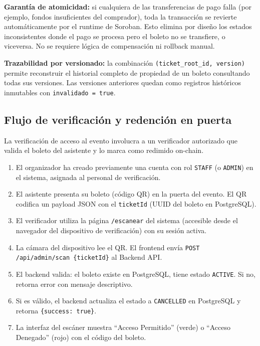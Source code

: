 \documentclass[12pt,oneside]{article}
\begin{document}
\textbf{Garantía de atomicidad:} si cualquiera de las transferencias de pago falla (por ejemplo, fondos insuficientes del comprador), toda la transacción se revierte automáticamente por el runtime de Soroban. Esto elimina por diseño los estados inconsistentes donde el pago se procesa pero el boleto no se transfiere, o viceversa. No se requiere lógica de compensación ni rollback manual.

\textbf{Trazabilidad por versionado:} la combinación \texttt{(ticket\_root\_id, version)} permite reconstruir el historial completo de propiedad de un boleto consultando todas sus versiones. Las versiones anteriores quedan como registros históricos inmutables con \texttt{invalidado = true}.

\subsection{Flujo de verificación y redención en puerta}

La verificación de acceso al evento involucra a un verificador autorizado que valida el boleto del asistente y lo marca como redimido on-chain.

\begin{enumerate}
  \item El organizador ha creado previamente una cuenta con rol \texttt{STAFF} (o \texttt{ADMIN}) en el sistema, asignada al personal de verificación.
  \item El asistente presenta su boleto (código QR) en la puerta del evento. El QR codifica un payload JSON con el \texttt{ticketId} (UUID del boleto en PostgreSQL).
  \item El verificador utiliza la página \texttt{/escanear} del sistema (accesible desde el navegador del dispositivo de verificación) con su sesión activa.
  \item La cámara del dispositivo lee el QR. El frontend envía \texttt{POST /api/admin/scan \{ticketId\}} al Backend API.
  \item El backend valida: el boleto existe en PostgreSQL, tiene estado \texttt{ACTIVE}. Si no, retorna error con mensaje descriptivo.
  \item Si es válido, el backend actualiza el estado a \texttt{CANCELLED} en PostgreSQL y retorna \texttt{\{success: true\}}.
  \item La interfaz del escáner muestra ``Acceso Permitido'' (verde) o ``Acceso Denegado'' (rojo) con el código del boleto.
\end{enumerate}
\end{document}
